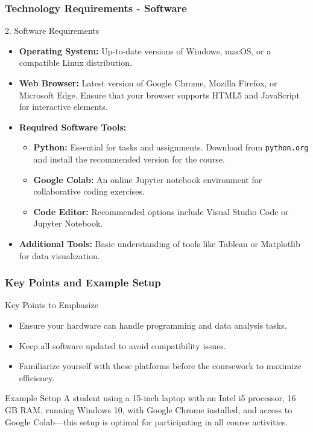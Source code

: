 \documentclass[aspectratio=169]{beamer}
\begin{document}
\begin{frame}[fragile]
    \frametitle{Technology Requirements - Software}
    \begin{block}{2. Software Requirements}
        \begin{itemize}
            \item \textbf{Operating System:} Up-to-date versions of Windows, macOS, or a compatible Linux distribution.
            
            \item \textbf{Web Browser:} Latest version of Google Chrome, Mozilla Firefox, or Microsoft Edge. Ensure that your browser supports HTML5 and JavaScript for interactive elements.
            
            \item \textbf{Required Software Tools:}
                \begin{itemize}
                    \item \textbf{Python:} Essential for tasks and assignments. Download from \texttt{python.org} and install the recommended version for the course.
                    \item \textbf{Google Colab:} An online Jupyter notebook environment for collaborative coding exercises.
                    \item \textbf{Code Editor:} Recommended options include Visual Studio Code or Jupyter Notebook.
                \end{itemize}
            
            \item \textbf{Additional Tools:} Basic understanding of tools like Tableau or Matplotlib for data visualization.
        \end{itemize}
    \end{block}
\end{frame}

\begin{frame}[fragile]
    \frametitle{Key Points and Example Setup}
    \begin{block}{Key Points to Emphasize}
        \begin{itemize}
            \item Ensure your hardware can handle programming and data analysis tasks.
            \item Keep all software updated to avoid compatibility issues.
            \item Familiarize yourself with these platforms before the coursework to maximize efficiency.
        \end{itemize}
    \end{block}
    
    \begin{block}{Example Setup}
        A student using a 15-inch laptop with an Intel i5 processor, 16 GB RAM, running Windows 10, with Google Chrome installed, and access to Google Colab—this setup is optimal for participating in all course activities.
    \end{block}
\end{frame}
\end{document}
